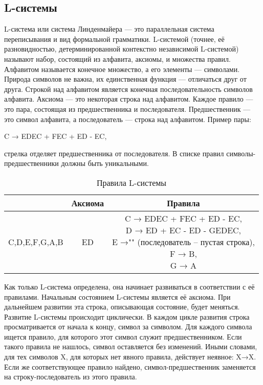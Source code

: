 \subsection{L-системы}
L-система или система Линденмайера — это параллельная система переписывания и вид формальной грамматики. L-системой (точнее, её разновидностью, детерминированной контекстно независимой L-системой) называют набор, состоящий из алфавита, аксиомы, и множества правил. Алфавитом называется конечное множество, а его элементы — символами. Природа символов не важна, их единственная функция — отличаться друг от друга. Строкой над алфавитом является конечная последовательность символов алфавита. Аксиома — это некоторая строка над алфавитом. Каждое правило — это пара, состоящая из предшественника и последователя. Предшественник — это символ алфавита, а последователь — строка над алфавитом. Пример пары:

C → EDEC + FEC + ED - EC,

стрелка отделяет предшественника от последователя. В списке правил символы-предшественники должны быть уникальными.

\begin{table}[H]
	\centering
	\caption{Правила L-системы}
	\begin{tabular}{|c|c|c|}
		\hline
		\makecell{Алфавит} & {Аксиома}  & {Правила}\\
		\hline
		{C,D,E,F,G,A,B} & ED & \makecell{C → EDEC + FEC + ED - EC, \\ D → ED + EC - ED - GEDEC, \\ E →"" (последователь -- пустая строка), \\ F → B, \\ G → A} \\
		\hline
	\end{tabular}
\end{table}

Как только L-система определена, она начинает развиваться в соответствии с её правилами. Начальным состоянием L-системы является её аксиома. При дальнейшем развитии эта строка, описывающая состояние, будет меняться. Развитие L-системы происходит циклически. В каждом цикле развития строка просматривается от начала к концу, символ за символом. Для каждого символа ищется правило, для которого этот символ служит предшественником. Если такого правила не нашлось, символ оставляется без изменений. Иными словами, для тех символов  X, для которых нет явного правила, действует неявное:  X→X. Если же соответствующее правило найдено, символ-предшественник заменяется на строку-последователь из этого правила.

